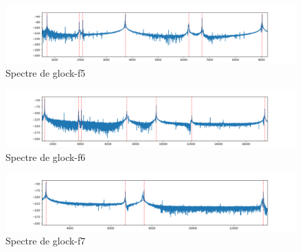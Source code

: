 \documentclass[atiam, article]{rapport} %
\begin{document}
\begin{figure}[h!]
  \begin{center}
      \includegraphics[width=\textwidth]{percu/glock-f5.wav.spectre.png}
  \end{center}
  \caption{Spectre de glock-f5}
\end{figure}
\begin{figure}[h!]
  \begin{center}
      \includegraphics[width=\textwidth]{percu/glock-f6.wav.spectre.png}
  \end{center}
  \caption{Spectre de glock-f6}
\end{figure}
\begin{figure}[h!]
  \begin{center}
      \includegraphics[width=\textwidth]{percu/glock-f7.wav.spectre.png}
  \end{center}
  \caption{Spectre de glock-f7}
\end{figure}





\newpage
\end{document}
